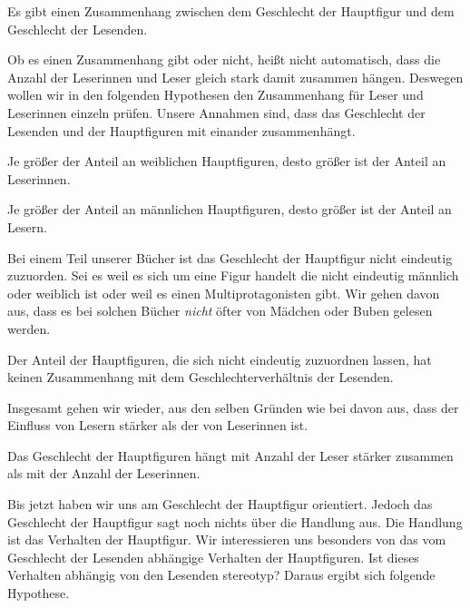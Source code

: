 \begin{hyp}\label{h2}
    Es gibt einen Zusammenhang zwischen dem Geschlecht der Hauptfigur
    und dem Geschlecht der Lesenden.
\end{hyp}

Ob es einen Zusammenhang gibt oder nicht, heißt nicht automatisch, dass
die Anzahl der Leserinnen und Leser gleich stark damit zusammen hängen.
Deswegen wollen wir in den folgenden Hypothesen den Zusammenhang für
Leser und Leserinnen einzeln prüfen. Unsere Annahmen sind, dass das
Geschlecht der Lesenden und der Hauptfiguren mit einander zusammenhängt.

\begin{subhyp}\label{h2.1}
       Je größer der Anteil an weiblichen Hauptfiguren,
        desto größer ist der Anteil an Leserinnen.
\end{subhyp}

\begin{subhyp}\label{h2.2}
       Je größer der Anteil an männlichen Hauptfiguren,
        desto größer ist der Anteil an Lesern.
\end{subhyp}

Bei einem Teil unserer Bücher ist das Geschlecht der Hauptfigur nicht
eindeutig zuzuorden. Sei es weil es sich um eine Figur handelt die nicht
eindeutig männlich oder weiblich ist oder weil es einen
Multiprotagonisten gibt. Wir gehen davon aus, dass es bei solchen Bücher
\emph{nicht} öfter von Mädchen oder Buben gelesen werden.

\begin{subhyp}\label{h2.3}
    Der Anteil der Hauptfiguren, die sich nicht eindeutig zuzuordnen lassen,   hat keinen Zusammenhang mit dem Geschlechterverhältnis der Lesenden.
\end{subhyp}

Insgesamt gehen wir wieder, aus den selben Gründen wie bei
 davon aus, dass der Einfluss von Lesern stärker als
der von Leserinnen ist.

\begin{subhyp}\label{h2.4}
   Das Geschlecht der Hauptfiguren hängt mit Anzahl der Leser stärker zusammen als mit der Anzahl der Leserinnen.
\end{subhyp}

Bis jetzt haben wir uns am Geschlecht der Hauptfigur orientiert. Jedoch
das Geschlecht der Hauptfigur sagt noch nichts über die Handlung aus.
Die Handlung ist das Verhalten der Hauptfigur. Wir interessieren uns
besonders von das vom Geschlecht der Lesenden abhängige Verhalten der
Hauptfiguren. Ist dieses Verhalten abhängig von den Lesenden stereotyp?
Daraus ergibt sich folgende Hypothese.

